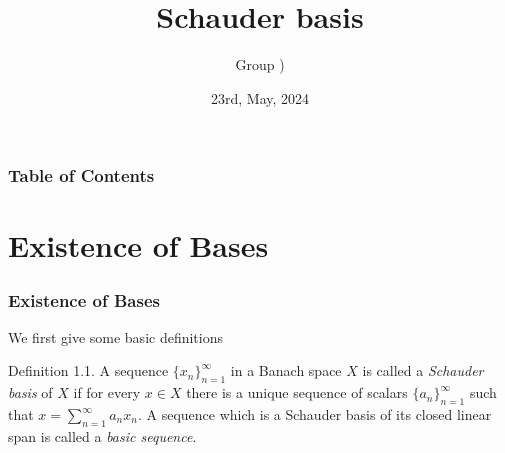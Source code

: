 \documentclass{beamer}
\title{Schauder basis}
\author{Group )}
\date{23rd, May, 2024}
\begin{document}
\begin{frame}
  \titlepage
\end{frame}

\begin{frame}
  \frametitle{Table of Contents}
  \tableofcontents
\end{frame}

\section{Existence of Bases}
\begin{frame}
  \frametitle{Existence of Bases}
    We first give some basic definitions
    \begin{block}{Definition 1.1.}
    A sequence $\{x_n\}_{n=1}^\infty$ in a Banach space $X$ is called a \textit{Schauder basis} of $X$
	if for every $x\in X$ there is a unique sequence of scalars $\{a_n\}_{n=1}^\infty$ such that 
	$x=\sum_{n=1}^\infty a_nx_n$.
	A sequence which is a Schauder basis of its closed linear span is called a \textit{basic sequence}.
    \end{block}  
\end{frame}
\end{document}
